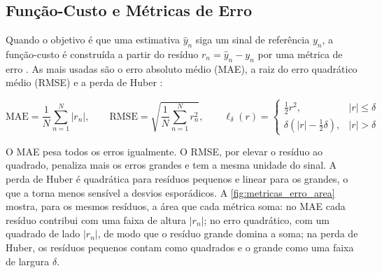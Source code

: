 \subsection{Função-Custo e Métricas de Erro}
\label{sec:funcao_custo_revbib}

Quando o objetivo é que uma estimativa $\hat{y}_n$ siga um sinal de referência
$y_n$, a função-custo é construída a partir do resíduo $r_n = \hat{y}_n - y_n$
por uma métrica de erro \cite{hermuche2023funcoes, datacamp2025cost}. As mais
usadas são o erro absoluto médio (MAE), a raiz do erro quadrático médio (RMSE) e
a perda de Huber \cite{huber1964robust}:

\begin{equation}
    \mathrm{MAE} = \frac{1}{N}\sum_{n=1}^{N} |r_n|, \qquad
    \mathrm{RMSE} = \sqrt{\frac{1}{N}\sum_{n=1}^{N} r_n^2}, \qquad
    \ell_\delta(r) =
    \begin{cases}
        \tfrac{1}{2} r^2, & |r| \le \delta \\
        \delta\left(|r| - \tfrac{1}{2}\delta\right), & |r| > \delta
    \end{cases}
    \label{eq:metricas_erro}
\end{equation}

O MAE pesa todos os erros igualmente. O RMSE, por elevar o resíduo ao
quadrado, penaliza mais os erros grandes e tem a mesma unidade do sinal. A
perda de Huber é quadrática para resíduos pequenos e linear para os grandes, o
que a torna menos sensível a desvios esporádicos. A
\autoref{fig:metricas_erro_area} mostra, para os mesmos resíduos, a área que
cada métrica soma: no MAE cada resíduo contribui com uma faixa de altura
$|r_n|$; no erro quadrático, com um quadrado de lado $|r_n|$, de modo que o
resíduo grande domina a soma; na perda de Huber, os resíduos pequenos contam
como quadrados e o grande como uma faixa de largura $\delta$.


